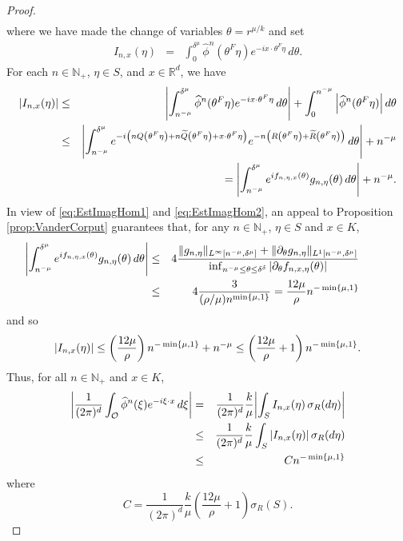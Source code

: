 \documentclass[11pt, letter]{book}
\newcommand{\f}[2]{\frac{#1}{#2}}
\begin{document}
\begin{proof}
\begin{eqnarray*}
\end{eqnarray*}
where we have made the change of variables $\theta=r^{\mu/ k}$ and set
\begin{eqnarray*}
    I_{n,x}(\eta)&=&\int_0^{\delta^{\mu}}\widehat{\phi}^n(\theta^F\eta)e^{-ix\cdot\theta^F\eta}\,d\theta.
\end{eqnarray*}
For each $n\in\mathbb{N}_+$, $\eta\in S$, and $x\in\mathbb{R}^d$, we have
\begin{eqnarray*}
\abs{I_{n,x}(\eta)}
&\leq & 
\abs{\int_{n^{-\mu}}^{\delta^{\mu}}\widehat{\phi}^n(\theta^F\eta)e^{-ix\cdot\theta^F\eta}\,d\theta} +\int_{0}^{n^{-\mu}}\abs{\widehat{\phi}^n(\theta^F\eta)}\,d\theta\\
&\leq& \abs{\int_{n^{-\mu}}^{\delta^\mu} e^{-i\left(nQ\left(\theta^F\eta\right)+n\widetilde{Q}\left(\theta^F\eta\right)+x\cdot\theta^F\eta\right)}e^{-n\left(R\left(\theta^F\eta\right)+\widetilde{R}\left(\theta^F\eta\right)\right)}\,d\theta}+n^{-\mu}\\
& &\hspace{1cm}=\abs{\int_{n^{-\mu}}^{\delta^\mu} e^{i f_{n,\eta,x}(\theta) } g_{n,\eta}(\theta)\,d\theta} 
+ n^{-\mu}.
\end{eqnarray*}
In view of \eqref{eq:EstImagHom1} and \eqref{eq:EstImagHom2}, an appeal to Proposition \ref{prop:VanderCorput} guarantees that, for any $n\in\mathbb{N}_+$, $\eta\in S$ and $x\in K$,
\begin{eqnarray*}
 \hspace{-1cm}\abs{\int_{n^{-\mu}}^{\delta^\mu}e^{if_{n,\eta,x}(\theta)}g_{n,\eta}(\theta)\,d\theta}
    &\leq& 
    4
    \frac{ 
    \|g_{n,\eta}\|_{L^\infty[n^{-\mu},\delta^{\mu}]}
    +
    \|\partial_{\theta}g_{n,\eta}\|_{L^1[n^{-\mu},\delta^{\mu}]}
    }{
    \inf_{n^{-\mu}\leq\theta\leq \delta^{\delta}}|\partial_{\theta}f_{n,x,\eta}(\theta)|
    }\\
    &\leq& 4\frac{3}{(\rho/\mu) n^{\min\{\mu,1\}}}=\frac{12\mu}{\rho}n^{-\min\{\mu,1\}}
\end{eqnarray*}
and so
\begin{equation*}
    \abs{I_{n,x}(\eta)}\leq \left(\frac{12\mu}{\rho}\right)n^{-\min\{\mu,1\}}+n^{-\mu}\leq \left(\frac{12\mu}{\rho}+1\right)n^{-\min\{\mu,1\}}.
\end{equation*}
Thus, for all $n\in\mathbb{N}_+$ and $x\in K$,
\begin{eqnarray*}
\abs{\f{1}{(2\pi)^d}\int_{\mathcal{O}}\widehat{\phi}^n(\xi)e^{-i\xi\cdot x}\,d\xi}
&=&\frac{1}{(2\pi)^d}\f{k}{\mu}\abs{\int_S I_{n,x}(\eta)\,\sigma_R(d\eta)} \\
&\leq& \frac{1}{(2\pi)^d}\f{k}{\mu}\int_S \abs{I_{n,x}(\eta)}\,\sigma_R(d\eta)\\
&\leq& Cn^{-\min\{\mu,1\}}
\end{eqnarray*}
where
\begin{equation*}
    C=\f{1}{(2\pi)^d} \f{k}{\mu} \left(\frac{12\mu}{\rho}+1\right)\sigma_R(S).
\end{equation*}
\end{proof}
\end{document}
